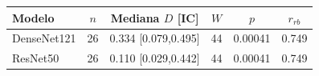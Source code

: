 \begin{tabular}{lccccc}
\toprule
Modelo & $n$ & Mediana $D$ [IC] & $W$ & $p$ & $r_{rb}$\\
\midrule
DenseNet121 & 26 & 0.334 [0.079,0.495] & 44 & 0.00041 & 0.749\\
ResNet50 & 26 & 0.110 [0.029,0.442] & 44 & 0.00041 & 0.749\\
\bottomrule
\end{tabular}